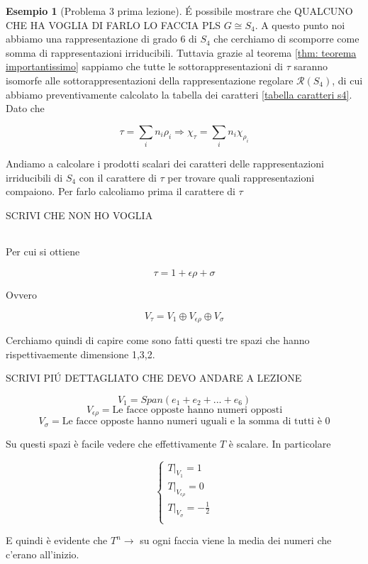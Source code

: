 \documentclass[11pt]{article}
\theoremstyle{plain}
\theoremstyle{definition}
\newtheorem{exmp}{Esempio}[section]
\theoremstyle{remark}
\newcommand{\dsum}{\displaystyle\sum}
\begin{document}
\begin{exmp}[Problema 3 prima lezione]
\'E possibile mostrare che QUALCUNO CHE HA VOGLIA DI FARLO LO FACCIA PLS $G \cong S_4$. A questo punto noi abbiamo una rappresentazione di grado 6 di $S_4$ che cerchiamo di scomporre come somma di rappresentazioni irriducibili. Tuttavia grazie al teorema \ref{thm: teorema importantissimo} sappiamo che tutte le sottorappresentazioni di $\tau$ saranno isomorfe alle sottorappresentazioni della rappresentazione regolare $\mathcal{R}(S_4)$, di cui abbiamo preventivamente calcolato la tabella dei caratteri \ref{tabella caratteri s4}. Dato che 


\[\tau = \dsum_i n_i\rho_i \Rightarrow \chi_\tau  = \dsum_i n_i\chi_{\rho_i}\]

Andiamo a calcolare i prodotti scalari dei caratteri delle rappresentazioni irriducibili di $S_4$ con il carattere di $\tau$ per trovare quali rappresentazioni compaiono. Per farlo calcoliamo prima il carattere di $\tau$


SCRIVI CHE NON HO VOGLIA

\begin{table}[!ht]
\centering
\begin{tabular}{|c|c|c|c|c|c|}
\hline


\end{tabular}
\end{table} 



Per cui si ottiene

\[\tau = 1 + \epsilon\rho + \sigma \]

Ovvero

\[V_\tau = V_1 \oplus V_{\epsilon\rho} \oplus V_{\sigma} \]


Cerchiamo quindi di capire come sono fatti questi tre spazi che hanno rispettivaemente dimensione 1,3,2. 


SCRIVI PI\'U DETTAGLIATO CHE DEVO ANDARE A LEZIONE

\[V_1 =  Span(e_1 + e_2 + ... + e_6) \]
\[V_{\epsilon\rho} = \text{Le facce opposte hanno numeri opposti}\]
\[V_{\sigma} = \text{Le facce opposte hanno numeri uguali e la somma di tutti è 0}\]

Su questi spazi è facile vedere che effettivamente $T$ è scalare. In particolare

\[
\begin{cases}
T|_{V_1} = 1 \\
T|_{V_{\epsilon\rho}} = 0 \\
T|_{V_\sigma} = -\frac{1}{2}\\
\end{cases}
\]

E quindi è evidente che $T^n \to $ su ogni faccia viene la media dei numeri che c'erano all'inizio.


\end{exmp}
\end{document}
